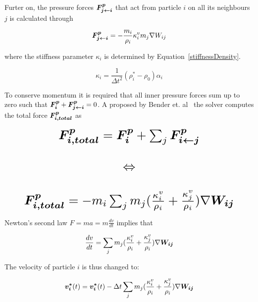     Furter on, the pressure forces $\bm{F_{j\leftarrow i}^p} $ that act from particle $i$ on all its neighbours $j$ is calculated through

    \begin{equation} \label{eq:pressure2}
        \bm{F_{j\leftarrow i}^p} = -\frac{m_i}{\rho_i} \kappa_i^v m_j \nabla W_{ij}
    \end{equation}

    where the stiffness parameter $\kappa_i$ is determined by Equation~\ref{stiffnessDensity}.

    \begin{equation} \label{stiffnessDensity}
    \kappa_i = \frac{1}{\Delta t^2}(\rho_i^*-\rho_0)\alpha_i
    \end{equation}

    To conserve momentum it is required that all inner pressure forces sum up to zero such that $\bm{F_i^p} + \bm{F_{j\leftarrow i}^p} = 0$. A proposed by Bender et. al~\cite{bender} the solver computes the total force $\bm{F_{i,total}^p}$ as

    \begin{equation} \label{eq:pressureTotal}
        \resizebox{0.88\linewidth}{!}{$
        \begin{matrix}
            \vect{F_{i,total}^p} = \vect{F_i^p} + \sum_j \vect{F_{i\leftarrow j}^p} \\
            \\
            \Leftrightarrow \\ 
            \\
            \vect{F_{i,total}^p} = -m_i \sum_j m_j (\frac{\kappa_i^v}{\rho_i} + \frac{\kappa_j^v}{\rho_i}) \nabla \vect{W_{ij}}
        \end{matrix}
        $}
    \end{equation}

    Newton's second law $F = ma = m\frac{dv}{dt}$ implies that 

    \begin{equation} \label{dvdt}
        \frac{dv}{dt} = \sum_j m_j (\frac{\kappa_i^v}{\rho_i} + \frac{\kappa_j^v}{\rho_i}) \nabla \bm{W_{ij}}
    \end{equation}

    The velocity of particle $i$ is thus changed to:

    \begin{equation} \label{eq:velocity}
        \bm{v_i^*}(t) = \bm{v_i^*}(t) - \Delta t \sum_j m_j (\frac{\kappa_i^v}{\rho_i} + \frac{\kappa_j^v}{\rho_i}) \nabla \bm{W_{ij}}
    \end{equation}

